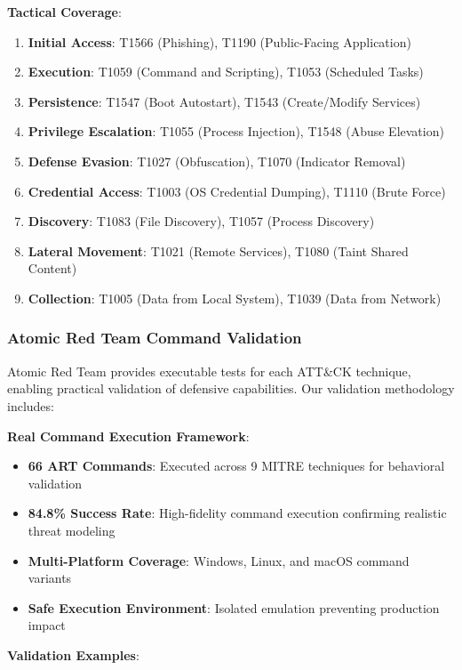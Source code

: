 \documentclass[12pt,oneside]{article}
\begin{document}
\textbf{Tactical Coverage}:
\begin{enumerate}
    \item \textbf{Initial Access}: T1566 (Phishing), T1190 (Public-Facing Application)
    \item \textbf{Execution}: T1059 (Command and Scripting), T1053 (Scheduled Tasks)
    \item \textbf{Persistence}: T1547 (Boot Autostart), T1543 (Create/Modify Services)
    \item \textbf{Privilege Escalation}: T1055 (Process Injection), T1548 (Abuse Elevation)
    \item \textbf{Defense Evasion}: T1027 (Obfuscation), T1070 (Indicator Removal)
    \item \textbf{Credential Access}: T1003 (OS Credential Dumping), T1110 (Brute Force)
    \item \textbf{Discovery}: T1083 (File Discovery), T1057 (Process Discovery)
    \item \textbf{Lateral Movement}: T1021 (Remote Services), T1080 (Taint Shared Content)
    \item \textbf{Collection}: T1005 (Data from Local System), T1039 (Data from Network)
\end{enumerate}

\subsubsection{Atomic Red Team Command Validation}

Atomic Red Team provides executable tests for each ATT\&CK technique, enabling practical validation of defensive capabilities. Our validation methodology includes:

\textbf{Real Command Execution Framework}:
\begin{itemize}
    \item \textbf{66 ART Commands}: Executed across 9 MITRE techniques for behavioral validation
    \item \textbf{84.8\% Success Rate}: High-fidelity command execution confirming realistic threat modeling
    \item \textbf{Multi-Platform Coverage}: Windows, Linux, and macOS command variants
    \item \textbf{Safe Execution Environment}: Isolated emulation preventing production impact
\end{itemize}

\textbf{Validation Examples}:
\end{document}
